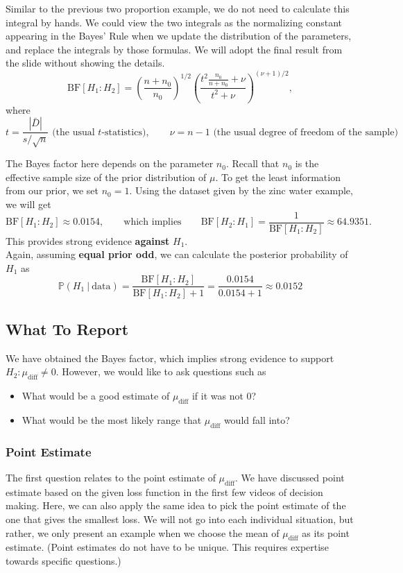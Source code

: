 \documentclass{article}
\begin{document}
Similar to the previous two proportion example, we do not need to calculate this integral by hands. We could view the two integrals as the normalizing constant appearing in the Bayes' Rule when we update the distribution of the parameters, and replace the integrals by those formulas. We will adopt the final result from the slide without showing the details.
$$ \text{BF}[H_1:H_2] = \left(\frac{n+n_0}{n_0}\right)^{1/2}\left(\frac{t^2\frac{n_0}{n+n_0}+\nu}{t^2+\nu}\right)^{(\nu+1)/2}, $$
where
$$ t = \frac{|\bar{D}|}{s/\sqrt{n}} \text{ (the usual $t$-statistics)},\qquad \nu = n-1\text{ (the usual degree of freedom of the sample)} $$

The Bayes factor here depends on the parameter $n_0$. Recall that $n_0$ is the effective sample size of the prior distribution of $\mu$. To get the least information from our prior, we set $n_0 = 1$. Using the dataset given by the zinc water example, we will get
$$ \text{BF}[H_1:H_2]\approx 0.0154, \qquad \text{which implies}\qquad \text{BF}[H_2:H_1] = \frac{1}{\text{BF}[H_1:H_2]} \approx 64.9351. $$
This provides strong evidence \textbf{against} $H_1$.\\ 

Again, assuming \textbf{equal prior odd}, we can calculate the posterior probability of $H_1$ as
$$ \mathbb{P}(H_1~|~\text{data}) = \frac{\text{BF}[H_1:H_2]}{\text{BF}[H_1:H_2]+1} = \frac{0.0154}{0.0154+1} \approx 0.0152$$

\subsection{What To Report}

We have obtained the Bayes factor, which implies strong evidence to support $H_2:\mu_\text{diff} \neq 0$. However, we would like to ask questions such as 
\begin{itemize}
	\item What would be a good estimate of $\mu_\text{diff}$ if it was not 0?
	\item What would be the most likely range that $\mu_\text{diff}$ would fall into?  
\end{itemize}

\subsubsection*{Point Estimate}

The first question relates to the point estimate of $\mu_\text{diff}$. We have discussed point estimate based on the given loss function in the first few videos of decision making. Here, we can also apply the same idea to pick the point estimate of the one that gives the smallest loss. We will not go into each individual situation, but rather, we only present an example when we choose the mean of $\mu_\text{diff}$ as its point estimate. (Point estimates do not have to be unique. This requires expertise towards specific questions.)\\
\end{document}
